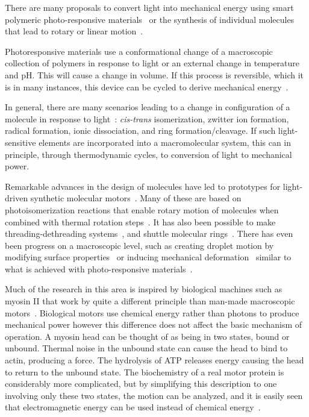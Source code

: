 \documentclass[journal = mamobx, manuscript = article]{achemso}
\begin{document}
There are many proposals to convert light into mechanical energy using smart
polymeric photo-responsive materials~\cite{IrieKunwatchakun,Irie,SuzukiHirasa,BehlLendlein,RoyGupta}
or the synthesis of individual molecules that lead to rotary or linear motion~\cite{credi2006}.  

Photoresponsive materials
use a conformational change of a macroscopic collection of polymers in response
to light or an external change in temperature and pH. This will cause a change
in volume. If this process is reversible, which it is in many instances, this
device can be cycled to derive mechanical energy~\cite{IrieKunwatchakun,Irie,SuzukiHirasa}. 

In general, there are many scenarios leading to a change in configuration of a molecule in
response to light~\cite{Irie}: {\em cis-trans} isomerization, zwitter ion formation, radical
formation, ionic dissociation, and ring formation/cleavage. If such
light-sensitive elements are incorporated into a macromolecular system, this can
in principle, through thermodynamic cycles, to conversion of light to
mechanical power.

Remarkable advances in the design of molecules have led to prototypes for
light-driven synthetic molecular motors~\cite{credi2006}. Many of these are
based on photoisomerization reactions that enable rotary motion of molecules
when combined with thermal rotation steps~\cite{terWiel2005,Ruangsupapichat,Vicario,credi2006}. 
It has also been possible to make threading-dethreading systems~\cite{Ashton1998,credi2006},
and shuttle molecular rings~\cite{Ashton2000,credi2006}. There has even been
progress on a macroscopic level, such as creating droplet motion by modifying surface
properties~\cite{Berna} or inducing mechanical deformation~\cite{Liu} similar to
what is achieved with photo-responsive materials~\cite{IrieKunwatchakun,Irie,SuzukiHirasa,BehlLendlein,RoyGupta}.

Much of the research in this area is inspired by biological machines such as myosin II that work by
quite a different principle than man-made macroscopic motors~\cite{BustamanteKellerOster}. Biological
motors use chemical energy rather than photons to produce mechanical power however this
difference does not affect the basic mechanism of operation. A myosin
head can be thought of as being in two states, bound or unbound. Thermal noise in the unbound state can cause
the head to bind to actin, producing a force. The hydrolysis of ATP releases energy
causing the head to return to the unbound state.  
The biochemistry of a real motor protein is considerably more complicated, but
by simplifying this description to one involving only these two states,
the motion can be analyzed, and 
it is easily seen that electromagnetic energy can be used instead of chemical
energy~\cite{ProstPRL}. 
\end{document}
